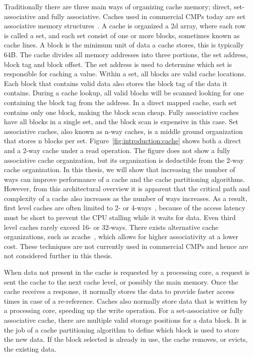 Traditionally there are three main ways of organizing cache memory; direct, set-associative and fully associative.
Caches used in commercial CMPs today are set associative memory structures~\cite{Thomadakis2011, Jain2013, ARM2010, Ho2014}.
A cache is organized a 2d array, where each row is called a set, and each set consist of one or more blocks, sometimes known as cache lines.
A block is the minimum unit of data a cache stores, this is typically 64B.
The cache divides all memory addresses into three portions, the set address, block tag and block offset.
The set address is used to determine which set is responsible for caching a value.
Within a set, all blocks are valid cache locations.
Each block that contains valid data also stores the block tag of the data it contains.
During a cache lookup, all valid blocks will be scanned looking for one containing the block tag from the address.
In a direct mapped cache, each set contains only one block, making the block scan cheap.
Fully associative caches have all blocks in a single set, and the block scan is expensive in this case.
Set associative caches, also known as n-way caches, is a middle ground organization that stores n blocks per set.
Figure~\ref{fig:introduction:cache} shows both a direct and a 2-way cache under a read operation.
The figure does not show a fully associative cache organization, but its organization is deductible from the 2-way cache organization.
In this thesis, we will show that increasing the number of ways can improve performance of a cache and the cache partitioning algorithms.
However, from this architectural overview it is apparent that the critical path and complexity of a cache also increases as the number of ways increases.
As a result, first level caches are often limited to 2- or 4-ways~\cite{Sachez2010}, because of the access latency must be short to prevent the CPU stalling while it waits for data. 
Even third level caches rarely exceed 16- or 32-ways.
There exists alternative cache organizations, such as zcache~\cite{Sanchez2010}, which allows for higher associativity at a lower cost.
These techniques are not currently used in commercial CMPs and hence are not considered further in this thesis.

When data not present in the cache is requested by a processing core, a request is sent the cache to the next cache level, or possibly the main memory.
Once the cache receives a response, it normally stores the data to provide faster access times in case of a re-reference.
Caches also normally store data that is written by a processing core, speeding up the write operation.
For a set-associative or fully associative cache, there are multiple valid storage positions for a data block.
It is the job of a cache partitioning algorithm to define which block is used to store the new data.
If the block selected is already in use, the cache removes, or evicts, the existing data.

